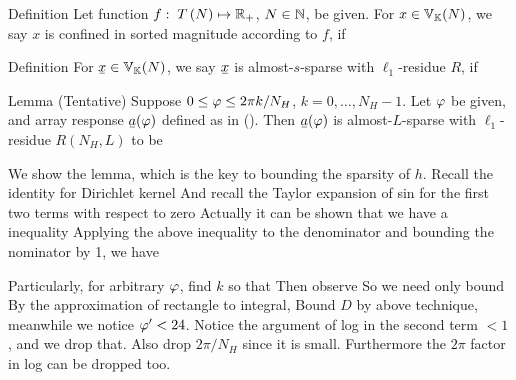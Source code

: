 \Result
{Definition}
{
Let function \(f:\; T\left( N \right) \mapsto \mathbb{R}_+\), \(N \in \mathbb{N}\), be given.
For \(x \in \mathbb{V}_{\mathbb{K}}(N)\), we say \(x\) is confined in sorted magnitude according to \(f\), if
}

\Result
{Definition}
{
For \(\V{x} \in \MB{V}_{\MB{K}}(N)\), we say \(\V{x}\) is almost-\(s\)-sparse with \(\ell_1\)-residue \(R\), if
}


\Result
{Lemma (Tentative)}
{
Suppose \(0 \leq \varphi \leq 2\pi k /N_H\), \(k =0, \dotsc, N_H-1\).
Let \(\varphi\) be given, and array response \(\V{a} (\f)\) defined as in ().
Then \(\V{a} (\f)\) is almost-\(L\)-sparse with \(\ell_1\)-residue \(R(N_H, L)\) to be
%
}

We show the lemma, which is the key to bounding the sparsity of \(h\).
Recall the identity for Dirichlet kernel
%
%
And recall the Taylor expansion of sin for the first two terms with respect to zero
%
%
Actually it can be shown that we have a inequality
%
%
Applying the above inequality to the denominator and bounding the nominator by 1, we have
%

Particularly, for arbitrary \(\varphi\), find \(k\) so that
%
Then observe
So we need only bound
By the approximation of rectangle to integral,
Bound \(D\) by above technique, meanwhile we notice \(\varphi' <24\).
Notice the argument of log in the second term \(<1\), and we drop that.
Also drop \(2\pi /N_H\) since it is small.
Furthermore the \(2\pi\) factor in log can be dropped too.

